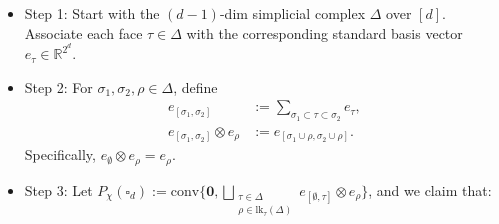 \documentclass[12pt]{article}
\theoremstyle{definition}
\numberwithin{equation}{subsection}
\begin{document}
\begin{itemize}
    \item Step 1: Start with the $(d-1)$-dim simplicial complex $\Delta$ over $[d]$. Associate each face $\tau \in \Delta$ with the corresponding standard basis vector $e_{\tau} \in \mathbb{R}^{2^d}$.
    \item Step 2: For $\sigma_{1},\sigma_{2}, \rho \in \Delta$, define 
    \begin{align*}
        e_{[\sigma_{1},\sigma_{2}]} &:= \sum_{\sigma_{1} \subset \tau \subset \sigma_{2}}e_{\tau}, \\
        e_{[\sigma_{1},\sigma_{2}]} \otimes e_{\rho} &:= e_{[\sigma_{1} \cup \rho, \sigma_{2} \cup \rho]}.
    \end{align*}
    Specifically, $e_{\emptyset} \otimes e_{\rho} = e_{\rho}$.
    \item Step 3: Let $P_{\chi}(\square_{d}) := \text{conv}\{\textbf{0}, \displaystyle \bigsqcup_{\substack{\tau \in \Delta \\ \rho \in \text{lk}_{\tau}(\Delta)}} e_{[\emptyset, \tau]} \otimes e_{\rho} \}$, and we claim that:
\end{itemize}
\end{document}
